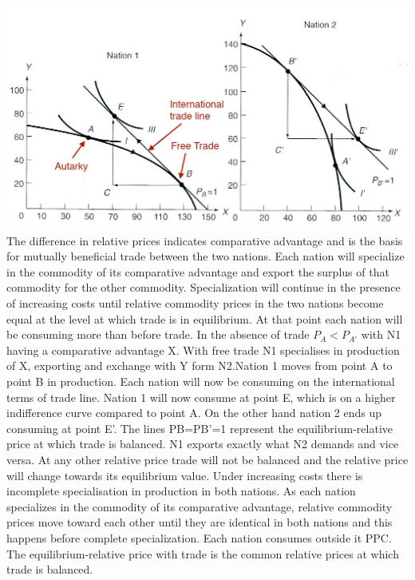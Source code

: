 \documentclass[12pt]{examnotes}
\begin{document}
\includegraphics[scale=0.4]{./imgs/35.jpg}
\ra The difference in relative prices indicates comparative advantage and is the basis for mutually beneficial trade between the two nations. 
\ra Each nation will specialize in the commodity of its comparative advantage and export the surplus of that commodity for the other commodity. 
\ra Specialization will continue in the presence of increasing costs until relative commodity prices in the two nations become equal at the level at which trade is in equilibrium. At that point each nation will be consuming more than before trade.
\ra In the absence of trade $P_A<P_{A'}$ with N1 having a comparative advantage X.
\ra With free trade N1 specialises in production of X, exporting and exchange with Y form N2.Nation 1 moves from point A to point B in production.
\ra Each nation will now be consuming on the international terms of trade line.
 Nation 1 will now consume at point E, which is on a higher indifference curve compared to point A. On the other hand nation 2 ends up consuming at point E’. 
\ra The lines PB=PB’=1 represent the equilibrium-relative price at which trade is balanced. N1 exports exactly what N2 demands and vice versa. At any other relative price trade will not be balanced and the relative price will change towards its equilibrium value. 
\ra Under increasing costs there is incomplete specialisation in production in both nations. As each nation specializes in the commodity of its comparative advantage, relative commodity prices move toward each other until they are identical in both nations and this happens before complete specialization.
\ra Each nation consumes outside it PPC.
\ra The equilibrium-relative price with trade is the common relative prices at which trade is balanced.
\end{document}
